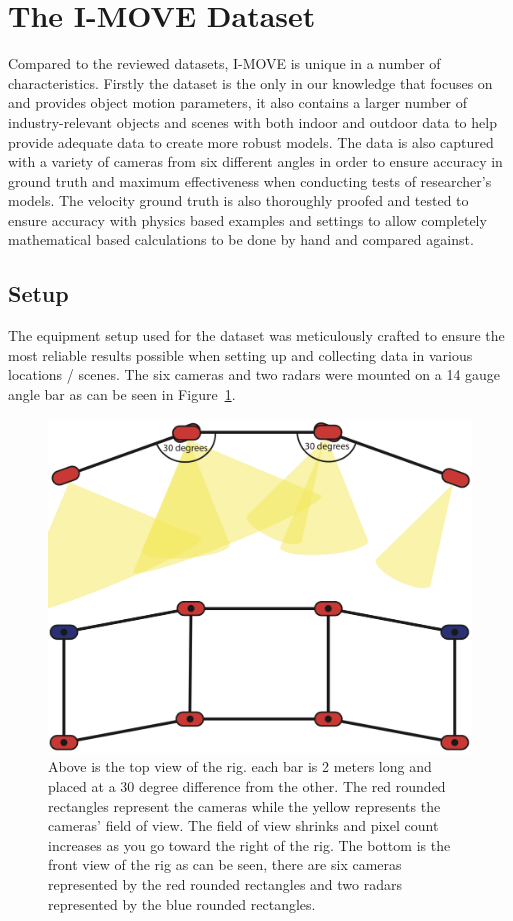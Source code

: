 \section{The I-MOVE Dataset}
Compared to the reviewed datasets, I-MOVE is unique in a number of characteristics. 
Firstly the dataset is the only in our knowledge that focuses on and provides object motion parameters, it also contains a larger number of industry-relevant objects and scenes with both indoor and outdoor data to help provide adequate data to create more robust models. 
The data is also captured with a variety of cameras from six different angles in order to ensure accuracy in ground truth and maximum effectiveness when conducting tests of researcher's models. 
The velocity ground truth is also thoroughly proofed and tested to ensure accuracy with physics based examples and settings to allow completely mathematical based calculations to be done by hand and compared against. 

\subsection{Setup}
The equipment setup used for the dataset was meticulously crafted to ensure the most reliable results possible when setting up and collecting data in various locations / scenes. 
The six cameras and two radars were mounted on a 14 gauge angle bar as can be seen in Figure~\ref{fig:RIG.png}.

\begin{figure}[t!]
    \includegraphics[width=\columnwidth]{Images/RIG.png}
    \caption{
    Above is the top view of the rig. each bar is 2 meters long and placed at a 30 degree difference from the other. The red rounded rectangles represent the cameras while the yellow represents the cameras' field of view. The field of view shrinks and pixel count increases as you go toward the right of the rig. The bottom is the front view of the rig as can be seen, there are six cameras represented by the red rounded rectangles and two radars represented by the blue rounded rectangles.
    }\label{fig:RIG.png} 
\end{figure}

